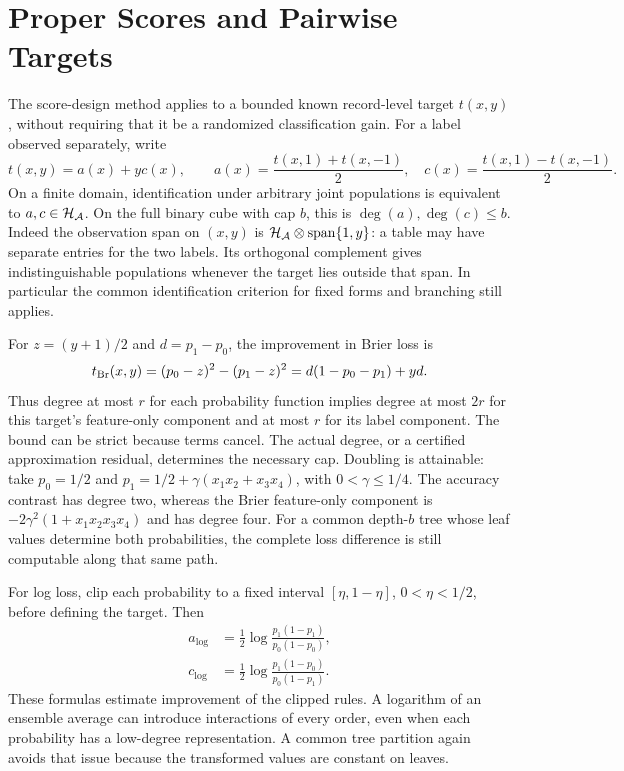 \section{Proper Scores and Pairwise Targets}\label{app:metrics}
The score-design method applies to a bounded known record-level target
$t(x,y)$, without requiring that it be a randomized classification gain.
For a label observed separately, write
\[
 t(x,y)=a(x)+yc(x),\qquad
 a(x)=\frac{t(x,1)+t(x,-1)}2,\quad
 c(x)=\frac{t(x,1)-t(x,-1)}2.
\]
On a finite domain, identification under arbitrary joint populations is
equivalent to $a,c\in\mathcal H_\mathcal A$. On the full binary cube with cap $b$, this is
$\deg(a),\deg(c)\le b$. Indeed the observation span on $(x,y)$ is
$\mathcal H_\mathcal A\otimes\operatorname{span}\{1,y\}$: a table may have separate
entries for the two labels. Its orthogonal complement gives indistinguishable
populations whenever the target lies outside that span. In particular the
common identification criterion for fixed forms and branching still applies.

For $z=(y+1)/2$ and $d=p_1-p_0$, the improvement in Brier loss is
\[
 t_{\rm Br}(x,y)=(p_0-z)^2-(p_1-z)^2
                =d(1-p_0-p_1)+yd.
\]
Thus degree at most $r$ for each probability function implies degree at most
$2r$ for this target's feature-only component and at most $r$ for its label
component. The bound can be strict because terms cancel. The actual degree,
or a certified approximation residual, determines the necessary cap.
Doubling is attainable: take $p_0=1/2$ and
$p_1=1/2+\gamma(x_1x_2+x_3x_4)$, with $0<\gamma\le1/4$.
The accuracy contrast has degree two, whereas the Brier feature-only
component is $-2\gamma^2(1+x_1x_2x_3x_4)$ and has degree four.
For a common depth-$b$ tree whose leaf values determine both probabilities,
the complete loss difference is still computable along that same path.

For log loss, clip each probability to a fixed interval
$[\eta,1-\eta]$, $0<\eta<1/2$, before defining the target. Then
\[
 \begin{split}
 a_{\log}&=\tfrac12\log\frac{p_1(1-p_1)}{p_0(1-p_0)},\\
 c_{\log}&=\tfrac12\log\frac{p_1(1-p_0)}{p_0(1-p_1)}.
 \end{split}
\]
These formulas estimate improvement of the clipped rules. A logarithm of
an ensemble average can introduce interactions of every order, even when
each probability has a low-degree representation. A common tree partition
again avoids that issue because the transformed values are constant on leaves.

